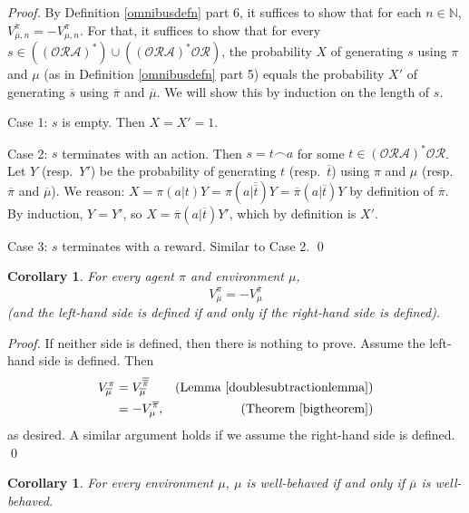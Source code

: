 \documentclass[runningheads]{llncs}
\newtheorem{mycorollary}[mytheorem]{Corollary}
\begin{document}
\begin{proof}
    By Definition \ref{omnibusdefn} part 6,
    it suffices to show that for each $n\in\mathbb N$,
    $V^{\overline \pi}_{\overline \mu,n}=-V^\pi_{\mu,n}$.
    For that, it suffices to show that for every
    $s\in ((\mathcal O\mathcal R\mathcal A)^*)
    \cup ((\mathcal O\mathcal R\mathcal A)^*\mathcal O\mathcal R)$,
    the probability $X$ of generating $s$ using $\pi$ and $\mu$
    (as in Definition \ref{omnibusdefn} part 5)
    equals the probability $X'$ of generating $\overline s$
    using $\overline \pi$ and $\overline \mu$.
    We will show this by induction on the length of $s$.

    Case 1: $s$ is empty. Then $X=X'=1$.

    Case 2: $s$ terminates with an action.
    Then $s=t\frown a$ for some $t\in(\mathcal O\mathcal R\mathcal A)^*\mathcal O\mathcal R$.
    Let $Y$ (resp.\ $Y'$) be the probability of generating $t$
    (resp.\ $\overline t$)
    using $\pi$ and $\mu$ (resp.\ $\overline\pi$ and $\overline\mu$).
    We reason: $X=\pi(a|t)Y=\pi(a|\overline{\overline t})Y=\overline \pi(a|\overline t)Y$
    by definition of $\overline\pi$. By induction, $Y=Y'$,
    so $X=\overline\pi(a|\overline t)Y'$, which by definition is $X'$.

    Case 3: $s$ terminates with a reward.
    Similar to Case 2.
    \qed
\end{proof}

\begin{mycorollary}
\label{twistcorollary}
    For every agent $\pi$ and environment $\mu$,
    \[V^\pi_{\overline\mu}=-V^{\overline\pi}_{\mu}\]
    (and the left-hand side is defined if and only if the right-hand side is defined).
\end{mycorollary}

\begin{proof}
    If neither side is defined, then there is nothing to prove.
    Assume the left-hand side is defined. Then
    \begin{align*}
        V^\pi_{\overline\mu}
        &= V^{\overline{\overline\pi}}_{\overline\mu}
            &\mbox{(Lemma \ref{doublesubtractionlemma})}\\
        &= -V^{\overline\pi}_\mu, &\mbox{(Theorem \ref{bigtheorem})}
    \end{align*}
    as desired. A similar argument holds if we assume the right-hand side is defined.
    \qed
\end{proof}

\begin{mycorollary}
\label{wisminuswcorollary}
    For every environment $\mu$, $\mu$ is well-behaved if and only if $\overline\mu$
    is well-behaved.
\end{mycorollary}
\end{document}
